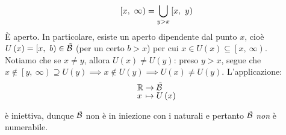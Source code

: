 \begin{example}
\begin{itemize}
\begin{equation*}
\left[x,\ \infty\right)=\union_{y>x}\left[x,\ y\right)
\end{equation*}
È aperto. In particolare, esiste un aperto dipendente dal punto $x$, cioè $U\left(x\right)=\left[x,\ b\right)\in\tilde{\basis}$ (per un certo $b>x$) per cui $x\in U\left(x\right)\subseteq\left[x,\ \infty\right)$.\\
Notiamo che se $x\neq y$, allora $U\left(x\right)\neq U\left(y\right)$: preso $y>x$, segue che $x\notin \left[y,\ \infty\right)\supseteq U\left(y\right)\implies x\notin U\left(y\right)\implies U\left(x\right)\neq U\left(y\right)$. L'applicazione:
\begin{equation}
\funztot{\ }{\realset}{\tilde{\basis}}{x}{U\left(x\right)}
\end{equation}
\end{itemize}
è iniettiva, dunque $\tilde{\mathcal{B}}$ non è in iniezione con i naturali e pertanto $\tilde{\mathcal{B}}$ \textit{non} è numerabile.
\end{example}
%
%

